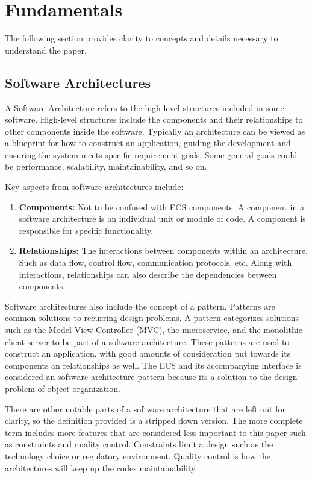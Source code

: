 \section{Fundamentals}

The following section provides clarity to concepts and details necessary to understand the paper.
\subsection{Software Architectures}
A Software Architecture refers to the high-level structures included in some software. High-level structures include the components and their relationships to other components inside the software. Typically an architecture can be viewed as a blueprint for how to construct an application, guiding the development and ensuring the system meets specific requirement goals. Some general goals could be performance, scalability, maintainability, and so on. 

Key aspects from software architectures include:

\begin{enumerate}
    \item \textbf{Components:} Not to be confused with ECS components. A component in a software architecture is an individual unit or module of code. A component is responsible for specific functionality.
    \item \textbf{Relationships:} The interactions between components within an architecture. Such as data flow, control flow, communication protocols, etc. Along with interactions, relationships can also describe the dependencies between components.
\end{enumerate}

Software architectures also include the concept of a pattern. Patterns are common solutions to recurring design problems. A pattern categorizes solutions such as the Model-View-Controller (MVC), the microservice, and the monolithic client-server to be part of a software architecture. These patterns are used to construct an application, with good amounts of consideration put towards its components an relationships as well. The ECS and its accompanying interface is considered an software architecture pattern because its a solution to the design problem of object organization.

There are other notable parts of a software architecture that are left out for clarity, so the definition provided is a stripped down version. The more complete term includes more features that are considered less important to this paper such as constraints and quality control. Constraints limit a design such as the technology choice or regulatory environment. Quality control is how the architectures will keep up the codes maintainability.

